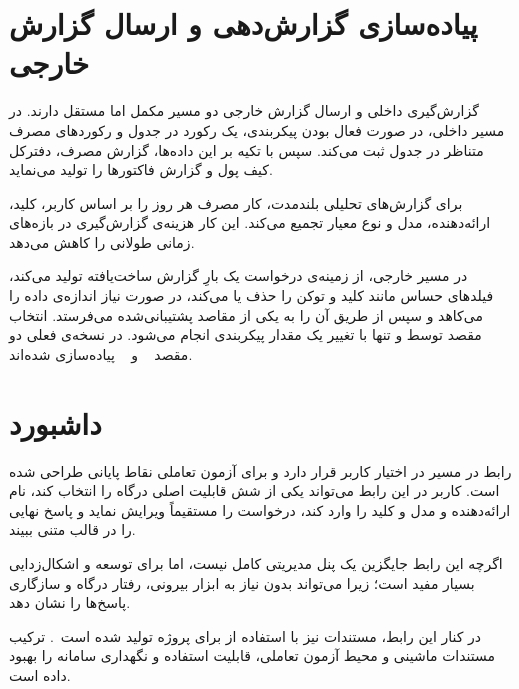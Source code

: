 \section{پیاده‌سازی گزارش‌دهی و ارسال گزارش خارجی}

گزارش‌گیری داخلی و ارسال گزارش خارجی دو مسیر مکمل اما مستقل دارند. در
مسیر داخلی،  در صورت فعال بودن پیکربندی، یک رکورد در
جدول  و رکوردهای مصرف متناظر در جدول
 ثبت می‌کند. سپس  با تکیه بر این
داده‌ها، گزارش مصرف، دفترکل کیف پول و گزارش فاکتورها را تولید می‌نماید.

برای گزارش‌های تحلیلی بلندمدت، کار  مصرف هر
روز را بر اساس کاربر، کلید، ارائه‌دهنده، مدل و نوع معیار تجمیع می‌کند.
این کار هزینه‌ی گزارش‌گیری در بازه‌های زمانی طولانی را کاهش می‌دهد.

در مسیر خارجی،  از زمینه‌ی درخواست یک بارِ گزارش
ساخت‌یافته تولید می‌کند، فیلدهای حساس مانند کلید و توکن را حذف یا
 می‌کند، در صورت نیاز اندازه‌ی داده را می‌کاهد و سپس
از طریق  آن را به یکی از مقاصد پشتیبانی‌شده
می‌فرستد. انتخاب مقصد توسط  و تنها با تغییر یک مقدار
پیکربندی انجام می‌شود. در نسخه‌ی فعلی دو مقصد 
~\cite{grafanaloki2024} و ~\cite{betterstack2024}
پیاده‌سازی شده‌اند.

\section{داشبورد }

رابط  در مسیر  در اختیار کاربر قرار دارد و
برای آزمون تعاملی نقاط پایانی طراحی شده است. کاربر در این رابط می‌تواند
یکی از شش قابلیت اصلی درگاه را انتخاب کند، نام ارائه‌دهنده و مدل و کلید
 را وارد کند،  درخواست را مستقیماً ویرایش نماید و پاسخ
نهایی را در قالب متنی ببیند.

اگرچه این رابط جایگزین یک پنل مدیریتی کامل نیست، اما برای توسعه و
اشکال‌زدایی بسیار مفید است؛ زیرا می‌تواند بدون نیاز به ابزار بیرونی،
رفتار درگاه و سازگاری پاسخ‌ها را نشان دهد.

در کنار این رابط، مستندات  نیز با استفاده از
 برای پروژه تولید شده است~\cite{l5swagger2024}. ترکیب
مستندات ماشینی و محیط آزمون تعاملی، قابلیت استفاده و نگهداری سامانه را
بهبود داده است.

